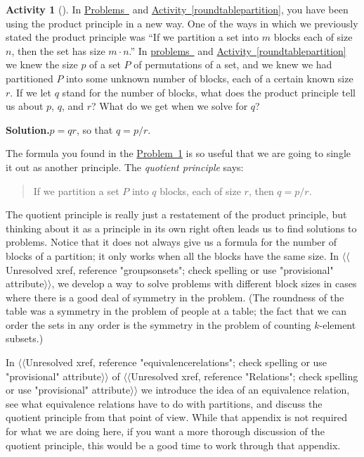\documentclass[10pt,]{book}
\theoremstyle{plain}
\theoremstyle{definition}
\newtheorem{activity}[project]{Activity}
\numberwithin{equation}{chapter}
\begin{document}
\begin{activity}[]\label{quotientprinciple}
In \hyperref[formulanchoosekfinal]{Problems~} and \hyperref[roundtablepartition]{Activity~\ref{roundtablepartition}}, you have been using the product principle in a new way. One of the ways in which we previously stated the product principle was ``If we partition a set into \(m\) blocks each of size \(n\), then the set has size \(m\cdot n\).'' In \hyperref[formulanchoosekfinal]{problems~} and \hyperref[roundtablepartition]{Activity~\ref{roundtablepartition}} we knew the size \(p\) of a set \(P\) of permutations of a set, and we knew we had partitioned \(P\) into some unknown number of blocks, each of a certain known size \(r\). If we let \(q\) stand for the number of blocks, what does the product principle tell us about \(p\), \(q\), and \(r\)? What do we get when we solve for \(q\)?%
\par\medskip\noindent%
\textbf{Solution.}\quad \(p=qr\), so that \(q=p/r\).%
\end{activity}
The formula you found in the \hyperref[quotientprinciple]{Problem~\ref{quotientprinciple}} is so useful that we are going to single it out as another principle. The \emph{quotient principle} says:%
\begin{quote}If we partition a set \(P\) into \(q\) blocks, each of size \(r\), then \(q=p/r.\)\end{quote}
The quotient principle is really just a restatement of the product principle, but thinking about it as a principle in its own right often leads us to find solutions to problems. Notice that it does not always give us a formula for the number of blocks of a partition; it only works when all the blocks have the same size. In {$\langle\langle$Unresolved xref, reference "groupsonsets"; check spelling or use "provisional" attribute$\rangle\rangle$}, we develop a way to solve problems with different block sizes in cases where there is a good deal of symmetry in the problem. (The roundness of the table was a symmetry in the problem of people at a table; the fact that we can order the sets in any order is the symmetry in the problem of counting \(k\)-element subsets.)%
\par
In {$\langle\langle$Unresolved xref, reference "equivalencerelations"; check spelling or use "provisional" attribute$\rangle\rangle$} of {$\langle\langle$Unresolved xref, reference "Relations"; check spelling or use "provisional" attribute$\rangle\rangle$} we introduce the idea of an equivalence relation, see what equivalence relations have to do with partitions, and discuss the quotient principle from that point of view. While that appendix is not required for what we are doing here, if you want a more thorough discussion of the quotient principle, this would be a good time to work through that appendix.%
\end{document}
